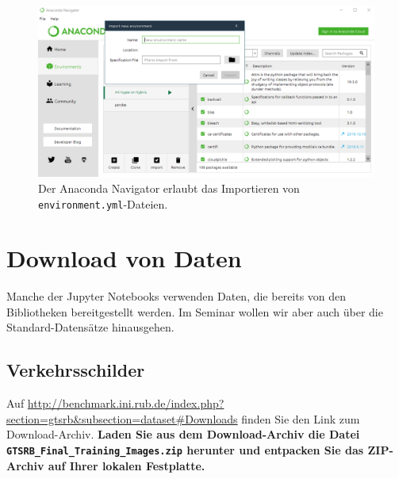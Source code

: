 \documentclass{tufte-handout}
\begin{document}
\begin{figure}[h]
  \includegraphics{anaconda-navigator}
  \caption{Der Anaconda Navigator erlaubt das Importieren von \texttt{environment.yml}-Dateien.}%
\label{fig:anaconda-navigator}
\end{figure}

\section{Download von Daten}

Manche der Jupyter Notebooks verwenden Daten, die bereits von den Bibliotheken bereitgestellt werden.
Im Seminar wollen wir aber auch über die Standard-Datensätze hinausgehen.

\subsection{Verkehrsschilder}

Auf \url{http://benchmark.ini.rub.de/index.php?section=gtsrb&subsection=dataset#Downloads} finden Sie den Link zum Download-Archiv.
{\bfseries
  Laden Sie aus dem Download-Archiv die Datei \texttt{GTSRB\_Final\_Training\_Images.zip} herunter und entpacken Sie das ZIP-Archiv auf Ihrer lokalen Festplatte.
}



\end{document}
